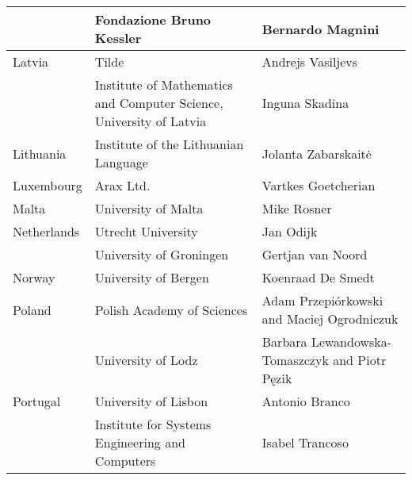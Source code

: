\documentclass[]{../metanetpaper}
\begin{document}
\begin{Parallel}[c]{80mm}{80mm}
\begin{tabular*}{\textwidth}{l|p{6cm}|p{4cm}}
    \hline & Fondazione Bruno Kessler & Bernardo Magnini\\
    \hline Latvia & Tilde & Andrejs Vasiljevs\\
    \hline & Institute of Mathematics and Computer Science, University of Latvia & Inguna Skadina\\
    \hline Lithuania & Institute of the Lithuanian Language & Jolanta Zabarskaitė\\
    \hline Luxembourg & Arax Ltd. & Vartkes Goetcherian\\
    \hline Malta & University of Malta & Mike Rosner\\
    \hline Netherlands & Utrecht University & Jan Odijk\\
    \hline & University of Groningen & Gertjan van Noord\\
    \hline Norway & University of Bergen & Koenraad De Smedt\\
    \hline Poland & Polish Academy of Sciences & Adam Przepiórkowski and
    Maciej Ogrodniczuk \\
    \hline & University of Lodz & Barbara Lewandowska-Tomaszczyk and Piotr Pęzik\\
    \hline Portugal & University of Lisbon & Antonio Branco\\
    \hline & Institute for Systems Engineering and Computers & Isabel Trancoso\\
    \hline
  \end{tabular*}

  \end{Parallel}

  
   
\end{document}
